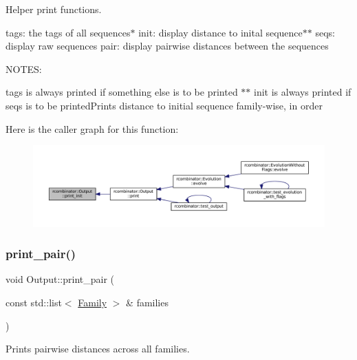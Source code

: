 Helper print functions. 

tags\+: the tags of all sequences$\ast$ init\+: display distance to inital sequence$\ast$$\ast$ seqs\+: display raw sequences pair\+: display pairwise distances between the sequences

N\+O\+T\+ES\+:
\begin{DoxyItemize}
\item tags is always printed if something else is to be printed $\ast$$\ast$ init is always printed if seqs is to be printed\+Prints distance to initial sequence family-\/wise, in order 
\end{DoxyItemize}Here is the caller graph for this function\+:
\nopagebreak
\begin{figure}[H]
\begin{center}
\leavevmode
\includegraphics[width=350pt]{classrcombinator_1_1Output_a365f66ac8299882ebfd6239d4c90b1bb_icgraph}
\end{center}
\end{figure}
\mbox{\label{classrcombinator_1_1Output_ac5632b57357788ba7d25769c412a2a11}} 
\subsubsection{\texorpdfstring{print\+\_\+pair()}{print\_pair()}}
{\footnotesize\ttfamily void Output\+::print\+\_\+pair (\begin{DoxyParamCaption}\item[{const std\+::list$<$ \mbox{\hyperlink{classrcombinator_1_1Family}{Family}} $>$ \&}]{families }\end{DoxyParamCaption})\hspace{0.3cm}{\ttfamily [private]}}



Prints pairwise distances across all families. 

